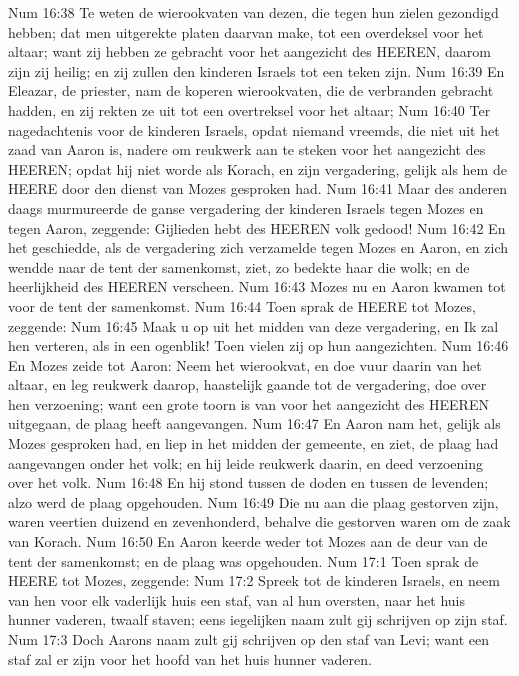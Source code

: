 Num 16:38  Te weten de wierookvaten van dezen, die tegen hun zielen gezondigd hebben; dat men uitgerekte platen daarvan make, tot een overdeksel voor het altaar; want zij hebben ze gebracht voor het aangezicht des HEEREN, daarom zijn zij heilig; en zij zullen den kinderen Israels tot een teken zijn.
Num 16:39  En Eleazar, de priester, nam de koperen wierookvaten, die de verbranden gebracht hadden, en zij rekten ze uit tot een overtreksel voor het altaar;
Num 16:40  Ter nagedachtenis voor de kinderen Israels, opdat niemand vreemds, die niet uit het zaad van Aaron is, nadere om reukwerk aan te steken voor het aangezicht des HEEREN; opdat hij niet worde als Korach, en zijn vergadering, gelijk als hem de HEERE door den dienst van Mozes gesproken had.
Num 16:41  Maar des anderen daags murmureerde de ganse vergadering der kinderen Israels tegen Mozes en tegen Aaron, zeggende: Gijlieden hebt des HEEREN volk gedood!
Num 16:42  En het geschiedde, als de vergadering zich verzamelde tegen Mozes en Aaron, en zich wendde naar de tent der samenkomst, ziet, zo bedekte haar die wolk; en de heerlijkheid des HEEREN verscheen.
Num 16:43  Mozes nu en Aaron kwamen tot voor de tent der samenkomst.
Num 16:44  Toen sprak de HEERE tot Mozes, zeggende:
Num 16:45  Maak u op uit het midden van deze vergadering, en Ik zal hen verteren, als in een ogenblik! Toen vielen zij op hun aangezichten.
Num 16:46  En Mozes zeide tot Aaron: Neem het wierookvat, en doe vuur daarin van het altaar, en leg reukwerk daarop, haastelijk gaande tot de vergadering, doe over hen verzoening; want een grote toorn is van voor het aangezicht des HEEREN uitgegaan, de plaag heeft aangevangen.
Num 16:47  En Aaron nam het, gelijk als Mozes gesproken had, en liep in het midden der gemeente, en ziet, de plaag had aangevangen onder het volk; en hij leide reukwerk daarin, en deed verzoening over het volk.
Num 16:48  En hij stond tussen de doden en tussen de levenden; alzo werd de plaag opgehouden.
Num 16:49  Die nu aan die plaag gestorven zijn, waren veertien duizend en zevenhonderd, behalve die gestorven waren om de zaak van Korach.
Num 16:50  En Aaron keerde weder tot Mozes aan de deur van de tent der samenkomst; en de plaag was opgehouden.
Num 17:1  Toen sprak de HEERE tot Mozes, zeggende:
Num 17:2  Spreek tot de kinderen Israels, en neem van hen voor elk vaderlijk huis een staf, van al hun oversten, naar het huis hunner vaderen, twaalf staven; eens iegelijken naam zult gij schrijven op zijn staf.
Num 17:3  Doch Aarons naam zult gij schrijven op den staf van Levi; want een staf zal er zijn voor het hoofd van het huis hunner vaderen.
